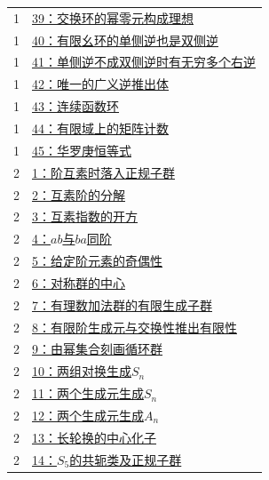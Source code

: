 \documentclass[UTF8,a4paper,11pt,fontset=windows]{ctexart}
\begin{document}
\begin{longtable}{cp{13.5cm}}
1 & \hyperref[ex:1:39]{39：交换环的幂零元构成理想}\\

1 & \hyperref[ex:1:40]{40：有限幺环的单侧逆也是双侧逆}\\

1 & \hyperref[ex:1:41]{41：单侧逆不成双侧逆时有无穷多个右逆}\\

1 & \hyperref[ex:1:42]{42：唯一的广义逆推出体}\\

1 & \hyperref[ex:1:43]{43：连续函数环}\\

1 & \hyperref[ex:1:44]{44：有限域上的矩阵计数}\\

1 & \hyperref[ex:1:45]{45：华罗庚恒等式}\\

2 & \hyperref[ex:2:1]{1：阶互素时落入正规子群}\\

2 & \hyperref[ex:2:2]{2：互素阶的分解}\\

2 & \hyperref[ex:2:3]{3：互素指数的开方}\\

2 & \hyperref[ex:2:4]{4：$ab$与$ba$同阶}\\

2 & \hyperref[ex:2:5]{5：给定阶元素的奇偶性}\\

2 & \hyperref[ex:2:6]{6：对称群的中心}\\

2 & \hyperref[ex:2:7]{7：有理数加法群的有限生成子群}\\

2 & \hyperref[ex:2:8]{8：有限阶生成元与交换性推出有限性}\\

2 & \hyperref[ex:2:9]{9：由幂集合刻画循环群}\\

2 & \hyperref[ex:2:10]{10：两组对换生成$S_n$}\\

2 & \hyperref[ex:2:11]{11：两个生成元生成$S_n$}\\

2 & \hyperref[ex:2:12]{12：两个生成元生成$A_n$}\\

2 & \hyperref[ex:2:13]{13：长轮换的中心化子}\\

2 & \hyperref[ex:2:14]{14：$S_5$的共轭类及正规子群}\\


\end{longtable}
\end{document}
